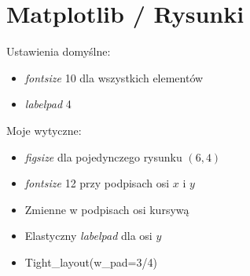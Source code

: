 \documentclass[12pt,a4paper,oneside]{book}
\theoremstyle{definition}
\begin{document}
\section{Matplotlib / Rysunki}

Ustawienia domyślne:
\begin{itemize}
	\item \textit{fontsize} 10 dla wszystkich elementów
	\item \textit{labelpad} 4
\end{itemize}
Moje wytyczne:
\begin{itemize}
	\item \textit{figsize} dla pojedynczego rysunku $(6, 4)$
	\item \textit{fontsize} 12 przy podpisach osi $x$ i $y$
	\item Zmienne w podpisach osi kursywą
	\item Elastyczny \textit{labelpad} dla osi $y$
	\item Tight\_layout(w\_pad=3/4)
\end{itemize}

\newpage
{}


\end{document}
